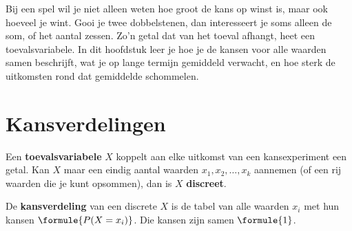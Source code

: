 %



Bij een spel wil je niet alleen weten hoe groot de kans op winst is, maar ook hoeveel je wint. Gooi je twee dobbelstenen, dan interesseert je soms alleen de som, of het aantal zessen. Zo'n getal dat van het toeval afhangt, heet een toevalsvariabele. In dit hoofdstuk leer je hoe je de kansen voor alle waarden samen beschrijft, wat je op lange termijn gemiddeld verwacht, en hoe sterk de uitkomsten rond dat gemiddelde schommelen.

\begin{oefeningen}[Start]

\end{oefeningen}


\section{Kansverdelingen}

\begin{theorie}
Een \textbf{\textcolor{accent}{toevalsvariabele}} $X$ koppelt aan elke uitkomst van een kansexperiment een getal. Kan $X$ maar een eindig aantal waarden $x_1, x_2, \ldots, x_k$ aannemen (of een rij waarden die je kunt opsommen), dan is $X$ \textbf{\textcolor{accent}{discreet}}.

\vspace{1mm}
De \textbf{\textcolor{accent}{kansverdeling}} van een discrete $X$ is de tabel van alle waarden $x_i$ met hun kansen $\formule{P(X = x_i)}$. Die kansen zijn samen $\formule{1}$.
\end{theorie}


